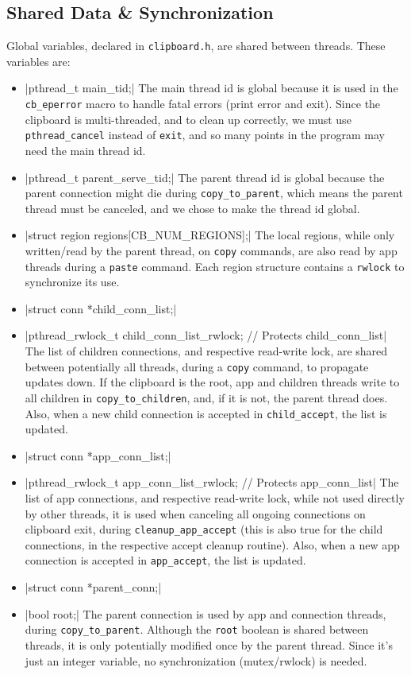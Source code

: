 \documentclass[a4paper, titlepage, english]{article}
\begin{document}
\subsection{Shared Data \& Synchronization}
\par
Global variables, declared in \texttt{clipboard.h}, are shared between threads. These variables are:
\begin{itemize}
	\item {}|pthread_t main_tid;|
	      The main thread id is global because it is used in the \texttt{cb\_eperror} macro to handle fatal errors (print error and exit). Since the clipboard is multi-threaded, and to clean up correctly, we must use \texttt{pthread\_cancel} instead of \texttt{exit}, and so many points in the program may need the main thread id.
	\item {}|pthread_t parent_serve_tid;|
	      The parent thread id is global because the parent connection might die during \texttt{copy\_to\_parent}, which means the parent thread must be canceled, and we chose to make the thread id global.
	\item {}|struct region regions[CB_NUM_REGIONS];|
	      The local regions, while only written/read by the parent thread, on \texttt{copy} commands, are also read by app threads during a \texttt{paste} command. Each region structure contains a \texttt{rwlock} to synchronize its use.
	\item {}|struct conn *child_conn_list;|
	\item {}|pthread_rwlock_t child_conn_list_rwlock; // Protects child_conn_list|
	      The list of children connections, and respective read-write lock, are shared between potentially all threads, during a \texttt{copy} command, to propagate updates down. If the clipboard is the root, app and children threads write to all children in \texttt{copy\_to\_children}, and, if it is not, the parent thread does. Also, when a new child connection is accepted in \texttt{child\_accept}, the list is updated.
	\item {}|struct conn *app_conn_list;|
	\item {}|pthread_rwlock_t app_conn_list_rwlock; // Protects app_conn_list|
	      The list of app connections, and respective read-write lock, while not used directly by other threads, it is used when canceling all ongoing connections on clipboard exit, during \texttt{cleanup\_app\_accept} (this is also true for the child connections, in the respective accept cleanup routine). Also, when a new app connection is accepted in \texttt{app\_accept}, the list is updated.
	\item {}|struct conn *parent_conn;|
	\item {}|bool root;|
	      The parent connection is used by app and connection threads, during \texttt{copy\_to\_parent}. Although the \texttt{root} boolean is shared between threads, it is only potentially modified once by the parent thread. Since it's just an integer variable, no synchronization (mutex/rwlock) is needed.
\end{itemize}
\end{document}
